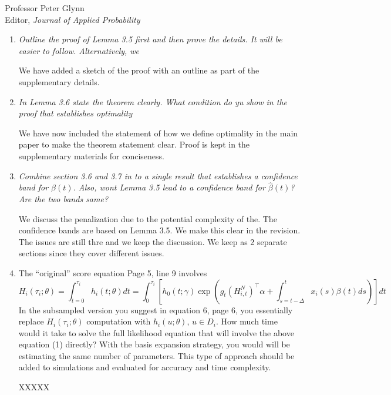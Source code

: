 \documentclass[11pt]{letter} %
\begin{document}
\begin{letter}{Professor
	Peter Glynn\\
	Editor, {\em Journal of Applied Probability}}
\begin{enumerate}
\item {\it Outline the proof of Lemma 3.5 first and then prove the details.  It will be easier to follow.  Alternatively, we }

\vspace{5mm}
We have added a sketch of the proof with an outline as part of the supplementary details.
\vspace{5mm}

\item {\it In Lemma 3.6 state the theorem clearly.  What condition do yu show in the proof that establishes optimality}

\vspace{5mm}
We have now included the statement of how we define optimality in the main paper to make the theorem statement clear.  Proof is kept in the supplementary materials for conciseness.
\vspace{5mm}

\item {\it Combine section 3.6 and 3.7 in to a single result that establishes a confidence band for $\beta (t)$. Also, wont Lemma 3.5 lead to a confidence band for $\hat \beta (t)$? Are the two bands same?}

\vspace{5mm}
We discuss the penalization due to the potential complexity of the.  The confidence bands are based on Lemma 3.5.  We make this clear in the revision.  The issues are still thre and we keep the discussion.  We keep as 2 separate sections since they cover different issues.
\vspace{5mm}

\item The ``original'' score equation Page 5, line 9 involves
$$
H_i (\tau_i ;\theta) = \int_{t=0}^{\tau_i} h_i (t; \theta)dt = \int_0^{\tau_i} \left[ h_0 (t;\gamma) \exp \left( g_t (H_{i,t}^N)^\top \alpha + \int_{s=t-\Delta}^t x_i (s) \beta(t) ds \right) \right] dt
$$
In the subsampled version you suggest in equation 6, page 6, you essentially replace $H_i (\tau_i; \theta)$ computation with $h_i (u; \theta)$, $u \in D_i$. How much time would it take to solve the full likelihood equation that will involve the above equation (1) directly? With the basis expansion strategy, you
would will be estimating the same number of parameters. This type of approach should be added to simulations and evaluated for accuracy and time complexity.

\vspace{5mm}
XXXXX
\vspace{5mm}


\end{enumerate}
\end{letter}
\end{document}
